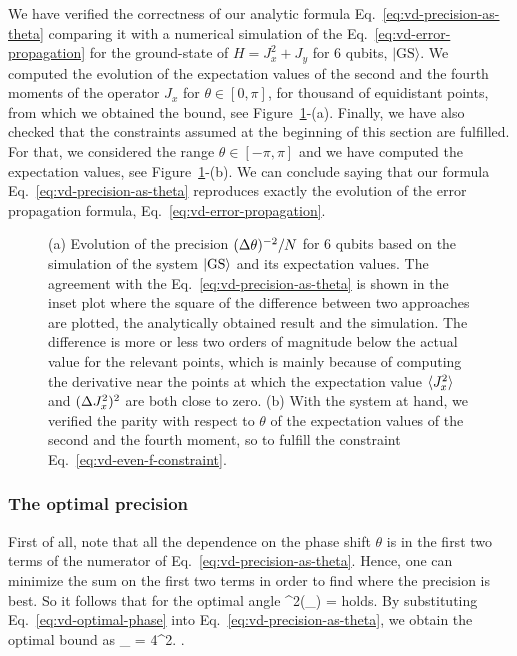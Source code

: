 We have verified the correctness of our analytic formula Eq.~\eqref{eq:vd-precision-as-theta} comparing it with a numerical simulation of the Eq.~\eqref{eq:vd-error-propagation} for the ground-state of $H=J_x^2+J_y$ for 6 qubits, $|\text{GS}\rangle$.
We computed the evolution of the expectation values of the second and the fourth moments of the operator $J_x$ for $\theta \in [0,\pi]$, for thousand of equidistant points, from which we obtained the bound, see Figure~\ref{fig:vd-evolution-of-precision}-(a).
Finally, we have also checked that the constraints assumed at the beginning of this section are fulfilled.
For that, we considered the range $\theta \in [-\pi,\pi]$ and we have computed the expectation values, see Figure~\ref{fig:vd-evolution-of-precision}-(b).
We can conclude saying that our formula Eq.~\eqref{eq:vd-precision-as-theta} reproduces exactly the evolution of the error propagation formula, Eq.~\eqref{eq:vd-error-propagation}.
\begin{figure}[htp]
  \centering
  \caption[(a) Evolution of $\varinv{\theta}/N$. (b) Evolution of the expectation values]{
  (a) Evolution of the precision $\varinv{\theta}/N$ for 6 qubits based on the simulation of the system $\vert{\text{GS}}\rangle$ and its expectation values.
  The agreement with the Eq.~\eqref{eq:vd-precision-as-theta} is shown in the inset plot where the square of the difference between two approaches are plotted, the analytically obtained result and the simulation.
  The difference is more or less two orders of magnitude below the actual value for the relevant points, which is mainly because of computing the derivative near the points at which the expectation value $\langle{J_x^2}\rangle$ and $(\Delta J_x^2 )^2$ are both close to zero.
  (b) With the system at hand, we verified the parity with respect to $\theta$ of the expectation values of the second and the fourth moment, so to fulfill the constraint Eq.~\eqref{eq:vd-even-f-constraint}.}
  \label{fig:vd-evolution-of-precision}
\end{figure}

\subsubsection{The optimal precision}
First of all, note that all the dependence on the phase shift $\theta$ is in the first two terms of the numerator of Eq.~\eqref{eq:vd-precision-as-theta}.
Hence, one can minimize the sum on the first two terms in order to find where the precision is best.
So it follows that for the optimal angle
\be
  \label{eq:vd-optimal-phase}
  \tan^2(\theta_{}) = 
\ee
holds.
By substituting Eq.~\eqref{eq:vd-optimal-phase} into Eq.~\eqref{eq:vd-precision-as-theta}, we obtain the optimal bound as
\be
  \varian{\theta}_{} = 
  {4^2}.
  \label{eq:vd-precision}
\ee.

